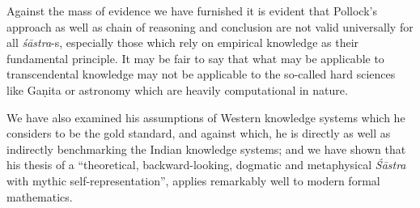 Against the mass of evidence we have furnished it is evident that Pollock’s approach as well as chain of reasoning and conclusion are not valid universally for all {\sl śāstra}-s, especially those which rely on empirical knowledge as their fundamental principle. It may be fair to say that what may be applicable to transcendental knowledge may not be applicable to the so-called hard sciences like Gaṇita or astronomy which are heavily computational in nature. 

We have also examined his assumptions of Western knowledge systems which he considers to be the gold standard, and against which, he is directly as well as indirectly benchmarking the Indian knowledge systems; and we have shown that his thesis of a ``theoretical, backward-looking, dogmatic and metaphysical {\sl Śāstra} with mythic self-representation'', applies remarkably well to modern formal mathematics.

